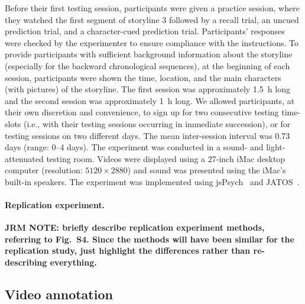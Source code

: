 \documentclass[10pt]{article}
\newcommand{\MethodsReplExp}{S4}
\begin{document}
Before their first testing session, participants were given a practice session, where they watched the first segment of storyline 3 followed by a recall trial, an uncued prediction trial, and a character-cued prediction trial. Participants' responses were checked by the experimenter to ensure compliance with the instructions. To provide participants with sufficient background information about the storyline (especially for the backward chronological sequences), at the beginning of each session, participants were shown the time, location, and the main characters (with pictures) of the storyline. The first session was approximately 1.5~h long and the second session was approximately 1~h long. We allowed participants, at their own discretion and convenience, to sign up for two consecutive testing time-slots (i.e., with their testing sessions occurring in immediate succession), or for testing sessions on two different days. The mean inter-session interval was 0.73 days (range: 0--4 days). The experiment was conducted in a sound- and light-attenuated testing room. Videos were displayed using a 27-inch iMac desktop computer (resolution: $5120 \times 2880$) and sound was presented using the iMac’s built-in speakers. The experiment was implemented using jsPsych~\citep{deLe15} and JATOS~\citep{LangEtal15}.

\paragraph{Replication experiment.} \textbf{JRM NOTE: briefly describe replication experiment methods, referring to Fig.~\MethodsReplExp. Since the methods will have been similar for the replication study, just highlight the differences rather than re-describing everything.}

\subsection*{Video annotation}
\end{document}
